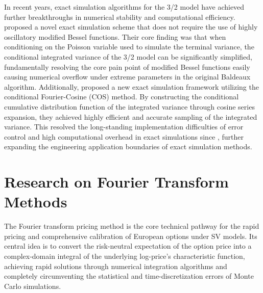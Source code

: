 In recent years, exact simulation algorithms for the 3/2 model have achieved further breakthroughs in numerical stability and computational efficiency. \citet{choiSimulationSchemesHeston2024} proposed a novel exact simulation scheme that does not require the use of highly oscillatory modified Bessel functions. Their core finding was that when conditioning on the Poisson variable used to simulate the terminal variance, the conditional integrated variance of the 3/2 model can be significantly simplified, fundamentally resolving the core pain point of modified Bessel functions easily causing numerical overflow under extreme parameters in the original Baldeaux algorithm. Additionally, \citet{brignoneExactSimulationStochastic2026} proposed a new exact simulation framework utilizing the conditional Fourier-Cosine (COS) method. By constructing the conditional cumulative distribution function of the integrated variance through cosine series expansion, they achieved highly efficient and accurate sampling of the integrated variance. This resolved the long-standing implementation difficulties of error control and high computational overhead in exact simulations since \citet{broadieExactSimulationStochastic2006}, further expanding the engineering application boundaries of exact simulation methods.

\section{Research on Fourier Transform Methods}

The Fourier transform pricing method is the core technical pathway for the rapid pricing and comprehensive calibration of European options under SV models. Its central idea is to convert the risk-neutral expectation of the option price into a complex-domain integral of the underlying log-price's characteristic function, achieving rapid solutions through numerical integration algorithms and completely circumventing the statistical and time-discretization errors of Monte Carlo simulations.


